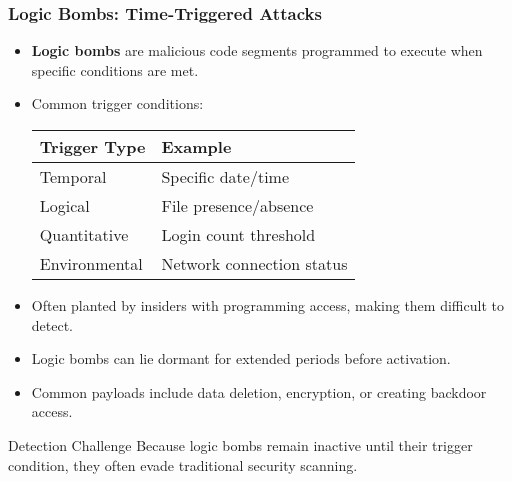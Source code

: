 \documentclass{beamer}
\begin{document}
\begin{frame}
    \frametitle{Logic Bombs: Time-Triggered Attacks}
    
    \begin{itemize}
        \item \textbf{Logic bombs} are malicious code segments programmed to execute when specific conditions are met.
        \item Common trigger conditions:
        
        \begin{tabular}{l|l}
            \textbf{Trigger Type} & \textbf{Example} \\
            \hline
            Temporal & Specific date/time \\
            Logical & File presence/absence \\
            Quantitative & Login count threshold \\
            Environmental & Network connection status \\
        \end{tabular}
        
        \item Often planted by insiders with programming access, making them difficult to detect.
        \item Logic bombs can lie dormant for extended periods before activation.
        \item Common payloads include data deletion, encryption, or creating backdoor access.
    \end{itemize}
    
    \begin{block}{Detection Challenge}
        Because logic bombs remain inactive until their trigger condition, they often evade traditional security scanning.
    \end{block}
\end{frame}
\end{document}
